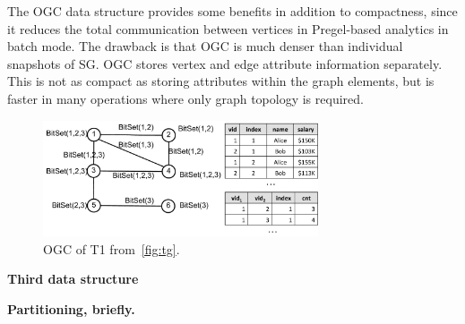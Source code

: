 The OGC data structure provides some benefits in addition to
compactness, since it reduces the total communication between vertices
in Pregel-based analytics in batch mode.  The drawback is that OGC is
much denser than individual snapshots of SG.  OGC stores vertex and
edge attribute information separately.  This is not as compact as
storing attributes within the graph elements, but is faster in many
operations where only graph topology is required.

\begin{figure}[t!]
\includegraphics[width=3.2in]{figs/ogc.pdf}
\caption{OGC of T1 from~\ref{fig:tg}.}
\label{fig:ogc}
\end{figure}


{\bf Third data structure}

{\bf Partitioning, briefly.}
